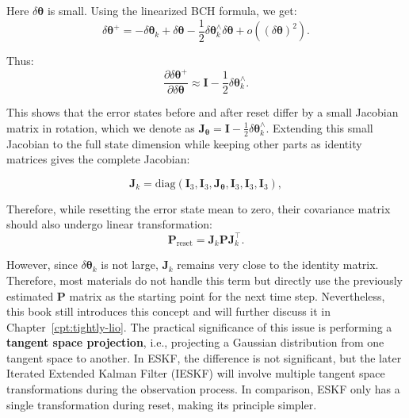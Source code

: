 Here $\delta \boldsymbol{\theta}$ is small. Using the linearized BCH formula, we get:
\begin{equation}\label{eq:linearized-reset}
	\delta \boldsymbol{\theta}^+ = -\delta \boldsymbol{\theta}_k + \delta \boldsymbol{\theta} - \frac{1}{2} \delta \boldsymbol{\theta}_k^\wedge \delta \boldsymbol{\theta} + o((\delta \boldsymbol{\theta})^2) .
\end{equation}

Thus:
\begin{equation}\label{eq:jacobian-derivation}
	\frac{\partial \delta \boldsymbol{\theta}^+}{\partial \delta \boldsymbol{\theta}} \approx \mathbf{I} - \frac{1}{2} \delta \boldsymbol{\theta}_k^\wedge .
\end{equation}

This shows that the error states before and after reset differ by a small Jacobian matrix in rotation, which we denote as $\mathbf{J}_{\boldsymbol{\theta}} = \mathbf{I} - \frac{1}{2} \delta \boldsymbol{\theta}_k^\wedge $. Extending this small Jacobian to the full state dimension while keeping other parts as identity matrices gives the complete Jacobian:

\begin{equation}\label{eq:full-jacobian}
	\mathbf{J}_k = \mathrm{diag}(\mathbf{I}_3, \mathbf{I}_3, \mathbf{J}_{\boldsymbol{\theta}}, \mathbf{I}_3, \mathbf{I}_3, \mathbf{I}_3),
\end{equation}

Therefore, while resetting the error state mean to zero, their covariance matrix should also undergo linear transformation:
\begin{equation}\label{eq:tangent-space-projection}
	\mathbf{P}_{\mathrm{reset}} = \mathbf{J}_k \mathbf{P} \mathbf{J}_k^\top.
\end{equation}

However, since $\delta \boldsymbol{\theta}_k$ is not large, $\mathbf{J}_k$ remains very close to the identity matrix. Therefore, most materials do not handle this term but directly use the previously estimated $\mathbf{P}$ matrix as the starting point for the next time step. Nevertheless, this book still introduces this concept and will further discuss it in Chapter~\ref{cpt:tightly-lio}. The practical significance of this issue is performing a \textbf{tangent space projection}, i.e., projecting a Gaussian distribution from one tangent space to another. In ESKF, the difference is not significant, but the later Iterated Extended Kalman Filter (IESKF) will involve multiple tangent space transformations during the observation process. In comparison, ESKF only has a single transformation during reset, making its principle simpler.
